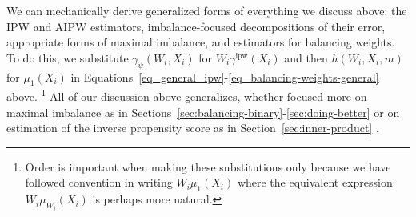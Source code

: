 \documentclass{article}
\theoremstyle{definition}
\newcommand{\ipw}{\text{ipw}}
\newcommand{\estimand}{\psi}
\newcommand{\gammaipw}{\ensuremath{\gamma^{\ipw}}}
\newcommand{\<}{\langle}
\renewcommand{\>}{\rangle}
\newcommand\cmnt[2]{\;
{\textcolor{red}{[{\em #1 --- #2}] \;}
}}
\newcommand\avi[1]{\cmnt{#1}{Avi}}
\begin{document}
We can mechanically derive generalized forms of everything we discuss above: the IPW and AIPW estimators, imbalance-focused decompositions of their error, appropriate forms of maximal imbalance, and estimators for balancing weights.
To do this, we substitute
$\gamma_{\estimand}(W_i,X_i)$ for $W_i\gammaipw(X_i)$ and then
$h(W_i,X_i,m)$ for $\mu_1(X_i)$ in Equations~\ref{eq_general_ipw}-\ref{eq_balancing-weights-general} above.%
%
\footnote{Order is important when making these substitutions only because we have followed convention in writing $W_i \mu_1(X_i)$ where the equivalent expression $W_i \mu_{W_i}(X_i)$ is perhaps more natural.}
All of our discussion above generalizes, whether focused more on maximal imbalance
as in Sections~\ref{sec:balancing-binary}-\ref{sec:doing-better}
\citep{hirshberg2021augmented} or on estimation of the inverse propensity score as in Section~\ref{sec:inner-product}  \citep{chernozhukov2018biased}.
\end{document}
